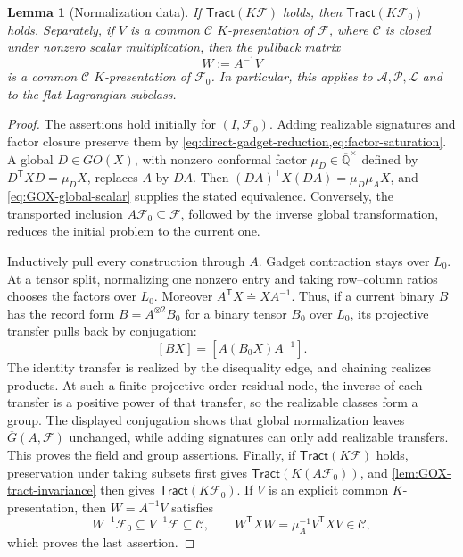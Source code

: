 \documentclass[11pt,letterpaper,onecolumn]{article}
\theoremstyle{plain}
\newtheorem{lemma}[lemma]{Lemma}
\theoremstyle{definition}
\theoremstyle{remark}
\newcommand{\AlgNums}{\overline{\mathbb Q}}
\newcommand{\cF}{\mathcal F}
\newcommand{\cA}{\mathscr A}
\newcommand{\cP}{\mathscr P}
\newcommand{\cL}{\mathscr L}
\newcommand{\cC}{\mathscr C}
\newcommand{\Tract}{\mathsf{Tract}}
\begin{document}
\begin{lemma}[Normalization data]
If \(\Tract(K\cF)\) holds, then
\(\Tract(K\cF_0)\) holds.  Separately, if
\(V\) is a common \(\cC\) \(K\)-presentation of \(\cF\), where
\(\cC\) is closed under nonzero scalar multiplication, then the pullback
matrix
\begin{equation*}
  W:=A^{-1}V
\end{equation*}
is a common \(\cC\) \(K\)-presentation of \(\cF_0\).  In particular, this
applies to \(\cA,\cP,\cL\) and to the flat-Lagrangian subclass.
\end{lemma}

\begin{proof}
The assertions hold initially for \((I,\cF_0)\).  Adding realizable signatures and
factor closure preserve them by
\cref{eq:direct-gadget-reduction,eq:factor-saturation}.  A global
\(D\in GO(X)\), with nonzero conformal factor
\(\mu_D\in\AlgNums^\times\) defined by \(D^{\mathsf T}XD=\mu_DX\), replaces \(A\) by
\(DA\). Then
\((DA)^{\mathsf T}X(DA)=\mu_D\mu_AX\), and
\cref{eq:GOX-global-scalar} supplies the stated equivalence.  Conversely,
the transported inclusion \(A\cF_0\subseteq\cF\), followed by the
inverse global transformation, reduces the initial problem to the current
one. 

Inductively pull every construction through \(A\).  Gadget contraction
stays over \(L_0\). At a tensor split, normalizing one nonzero entry and
taking row--column ratios chooses the factors over \(L_0\).  Moreover
\(A^{\mathsf T}X\doteq XA^{-1}\).  Thus, if a current binary \(B\) has the
record form \(B=A^{\otimes2}B_0\) for a binary tensor \(B_0\) over \(L_0\),
its projective transfer pulls back by
conjugation:
\[
 [BX]=[A(B_0X)A^{-1}].
\]
The identity transfer is realized by the disequality edge, and chaining realizes
products.  At such a finite-projective-order residual node, the inverse of each transfer is a
positive power of that transfer, so the realizable classes form a group.
The displayed conjugation shows that global normalization leaves
\(\overline G(A,\cF)\) unchanged, while adding signatures can only add realizable transfers.  This proves the field and group assertions.
Finally, if \(\Tract(K\cF)\) holds, preservation under taking subsets first gives
\(\Tract(K(A\cF_0))\), and \cref{lem:GOX-tract-invariance} then gives
\(\Tract(K\cF_0)\).  If \(V\) is an explicit common \(K\)-presentation, then
\(W=A^{-1}V\) satisfies
\[
 W^{-1}\cF_0\subseteq V^{-1}\cF\subseteq\cC,
 \qquad
 W^{\mathsf T}XW=\mu_A^{-1}V^{\mathsf T}XV\in\cC,
\]
which proves the last assertion.
\end{proof}
\end{document}
